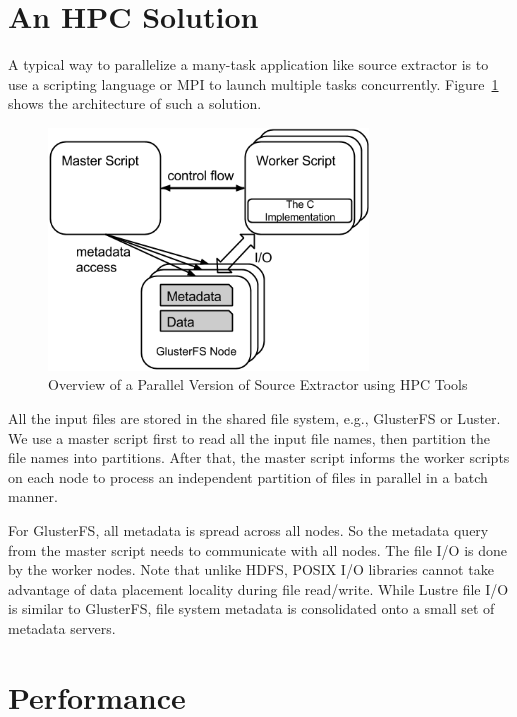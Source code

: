 \documentclass[10pt,journal,compsoc]{IEEEtran}
\begin{document}
\section{An HPC Solution}
\label{sec:HPC}
A typical way to parallelize a many-task application like source extractor is to use a scripting language
or MPI to launch multiple tasks concurrently. Figure~\ref{fig:hpc-architecture} shows the architecture
of such a solution.

\begin{figure}[t]
	\begin{center}
		\includegraphics[width=85mm]{pictures/HPC-Architecture}
		\caption{Overview of a Parallel Version of Source Extractor using HPC Tools}
		\label{fig:hpc-architecture}
  	\end{center}
\end{figure}

All the input files are stored in the shared file system, e.g., GlusterFS or Luster. We use a master script
first to read all the input file names, then partition the file names into partitions. After that, the master
script informs the worker scripts on each node to process an independent partition of files in parallel 
in a batch manner.

For GlusterFS, all metadata is spread across all nodes. So the metadata query from the master script
needs to communicate with all nodes. The file I/O is done by the worker nodes. Note that unlike HDFS, 
POSIX I/O libraries cannot take advantage of data placement locality during file read/write. While Lustre 
file I/O is similar to GlusterFS, file system metadata is consolidated onto a small set of metadata servers.


\section{Performance}
\label{sec:Performance}
\end{document}
